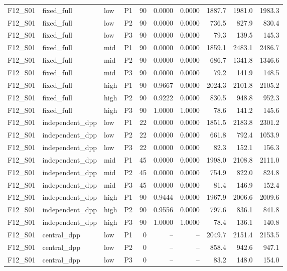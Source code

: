 \begin{longtable}{llllrrrrrr}
F12\_S01 & fixed\_full & low & P1 & 90 & 0.0000 & 0.0000 & 1887.7 & 1981.0 & 1983.3 \\
F12\_S01 & fixed\_full & low & P2 & 90 & 0.0000 & 0.0000 & 736.5 & 827.9 & 830.4 \\
F12\_S01 & fixed\_full & low & P3 & 90 & 0.0000 & 0.0000 & 79.3 & 139.5 & 145.3 \\
F12\_S01 & fixed\_full & mid & P1 & 90 & 0.0000 & 0.0000 & 1859.1 & 2483.1 & 2486.7 \\
F12\_S01 & fixed\_full & mid & P2 & 90 & 0.0000 & 0.0000 & 686.7 & 1341.8 & 1346.6 \\
F12\_S01 & fixed\_full & mid & P3 & 90 & 0.0000 & 0.0000 & 79.2 & 141.9 & 148.5 \\
F12\_S01 & fixed\_full & high & P1 & 90 & 0.9667 & 0.0000 & 2024.3 & 2101.8 & 2105.2 \\
F12\_S01 & fixed\_full & high & P2 & 90 & 0.9222 & 0.0000 & 830.5 & 948.8 & 952.3 \\
F12\_S01 & fixed\_full & high & P3 & 90 & 1.0000 & 1.0000 & 78.6 & 141.2 & 145.6 \\
F12\_S01 & independent\_dpp & low & P1 & 22 & 0.0000 & 0.0000 & 1851.5 & 2183.8 & 2301.2 \\
F12\_S01 & independent\_dpp & low & P2 & 22 & 0.0000 & 0.0000 & 661.8 & 792.4 & 1053.9 \\
F12\_S01 & independent\_dpp & low & P3 & 22 & 0.0000 & 0.0000 & 82.3 & 152.1 & 156.3 \\
F12\_S01 & independent\_dpp & mid & P1 & 45 & 0.0000 & 0.0000 & 1998.0 & 2108.8 & 2111.0 \\
F12\_S01 & independent\_dpp & mid & P2 & 45 & 0.0000 & 0.0000 & 754.9 & 822.0 & 824.8 \\
F12\_S01 & independent\_dpp & mid & P3 & 45 & 0.0000 & 0.0000 & 81.4 & 146.9 & 152.4 \\
F12\_S01 & independent\_dpp & high & P1 & 90 & 0.9444 & 0.0000 & 1967.9 & 2006.6 & 2009.6 \\
F12\_S01 & independent\_dpp & high & P2 & 90 & 0.9556 & 0.0000 & 797.6 & 836.1 & 841.8 \\
F12\_S01 & independent\_dpp & high & P3 & 90 & 1.0000 & 1.0000 & 78.4 & 136.1 & 140.8 \\
F12\_S01 & central\_dpp & low & P1 & 0 & -- & -- & 2049.7 & 2151.4 & 2153.5 \\
F12\_S01 & central\_dpp & low & P2 & 0 & -- & -- & 858.4 & 942.6 & 947.1 \\
F12\_S01 & central\_dpp & low & P3 & 0 & -- & -- & 83.2 & 148.0 & 154.0 \\

\end{longtable}

